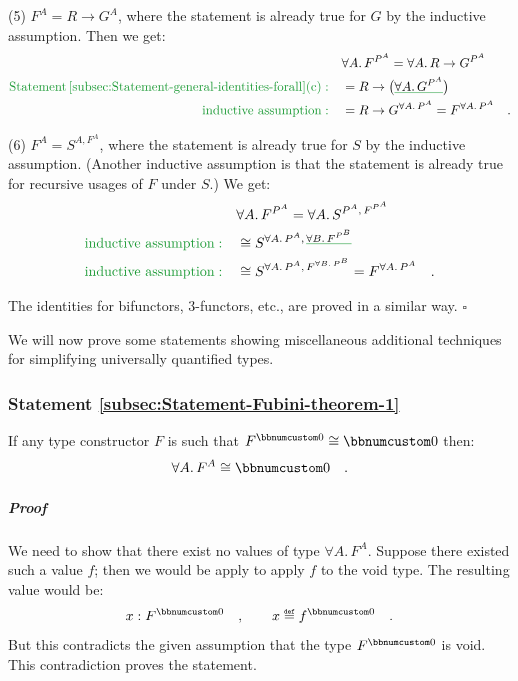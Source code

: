 (5) $F^{A}=R\rightarrow G^{A}$, where the statement is already true
for $G$ by the inductive assumption. Then we get:
\begin{align*}
 & \forall A.\,F^{P^{A}}=\forall A.\,R\rightarrow G^{P^{A}}\\
{\color{greenunder}\text{Statement\,\ref{subsec:Statement-general-identities-forall}(c)}:}\quad & =R\rightarrow\big(\gunderline{\forall A.\,G^{P^{A}}}\big)\\
{\color{greenunder}\text{inductive assumption}:}\quad & =R\rightarrow G^{\forall A.\,P^{A}}=F^{\forall A.\,P^{A}}\quad.
\end{align*}

(6) $F^{A}=S^{A,F^{A}}$, where the statement is already true for
$S$ by the inductive assumption. (Another inductive assumption is
that the statement is already true for recursive usages of $F$ under
$S$.) We get:
\begin{align*}
 & \forall A.\,F^{P^{A}}=\forall A.\,S^{P^{A},\,F^{P^{A}}}\\
{\color{greenunder}\text{inductive assumption}:}\quad & \cong S^{\forall A.\,P^{A},\,\gunderline{\forall B.\,F^{P^{B}}}}\\
{\color{greenunder}\text{inductive assumption}:}\quad & \cong S^{\forall A.\,P^{A},\,F^{\forall B.\,P^{B}}}=F^{\forall A.\,P^{A}}\quad.
\end{align*}

The identities for bifunctors, $3$-functors, etc., are proved in
a similar way. $\square$

We will now prove some statements showing miscellaneous additional
techniques for simplifying universally quantified types.

\subsubsection{Statement \label{subsec:Statement-Fubini-theorem-1}\ref{subsec:Statement-Fubini-theorem-1}}

If any type constructor $F$ is such that $F^{\bbnum 0}\cong\bbnum 0$
then:
\[
\forall A.\,F^{A}\cong\bbnum 0\quad.
\]


\subparagraph{Proof}

We need to show that there exist no values of type $\forall A.\,F^{A}$.
Suppose there existed such a value $f$; then we would be apply to
apply $f$ to the void type. The resulting value would be:
\[
x:F^{\bbnum 0}\quad,\quad\quad x\triangleq f^{\bbnum 0}\quad.
\]
But this contradicts the given assumption that the type $F^{\bbnum 0}$
is void. This contradiction proves the statement.

